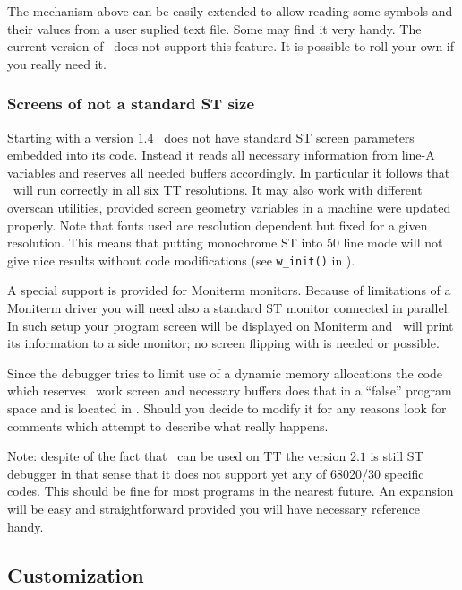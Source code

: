 The mechanism above can be easily extended to allow reading some
symbols and their values from a user suplied text file.  Some may find
it very handy.  The current version of \szadb\ does not support this
feature.  It is possible to roll your own if you really need it.


\subsubsection{Screens of not a standard ST size}

Starting with a version $1.4$ \szadb\ does not have standard ST
screen parameters embedded into its code.  Instead it reads all
necessary information from line-A variables and reserves all needed
buffers accordingly.  In particular it follows that \szadb\ will
run correctly in all six TT resolutions.  It may also work with
different overscan utilities, provided screen geometry variables
in a machine were updated properly.  Note that fonts used are
resolution dependent but fixed for a given resolution.  This means
that putting monochrome ST into 50 line mode will not give nice
results without code modifications (see \verb|w_init()| in
).

A special support is provided for Moniterm monitors.  Because
of limitations of a Moniterm driver you will need also a standard
ST monitor connected in parallel.  In such setup your program
screen will be displayed on Moniterm and \szadb\ will print its
information to a side monitor; no screen flipping with 
is needed or possible.

Since the debugger tries to limit use of a dynamic memory allocations
the code which reserves \szadb\ work screen and necessary buffers
does that in a ``false'' program space and is located in .
Should you decide to modify it for any reasons look for comments
which attempt to describe what really happens.

Note: despite of the fact that \szadb\ can be used on TT the 
version $2.1$ is still ST debugger in that sense that it does not support
yet any of 68020/30 specific codes.  This should be fine for most
programs in the nearest future.  An expansion will be easy and
straightforward provided you will have necessary reference handy.

\subsection{Customization}

